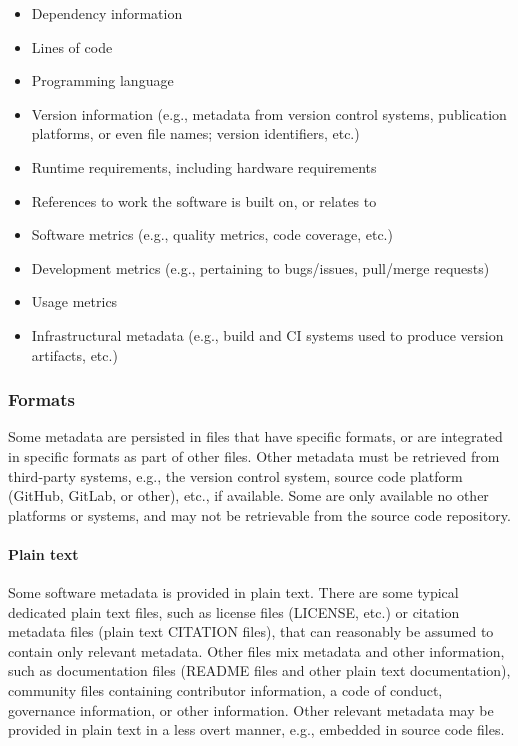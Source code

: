 \documentclass{article}
\begin{document}
\begin{itemize}  
  \item Dependency information
  \item Lines of code
  \item Programming language
  \item Version information (e.g., metadata from version control systems, publication platforms, or even file names; version identifiers, etc.)
  \item Runtime requirements, including hardware requirements
  \item References to work the software is built on, or relates to
  \item Software metrics (e.g., quality metrics, code coverage, etc.)
  \item Development metrics (e.g., pertaining to bugs/issues, pull/merge requests)
  \item Usage metrics
  \item Infrastructural metadata (e.g., build and CI systems used to produce version artifacts, etc.)
\end{itemize}

\subsubsection{Formats}\label{subsubsec:metadata-formats}
Some metadata are persisted in files that have specific formats, or are integrated in specific formats as part of other files. Other metadata must be retrieved from third-party systems, e.g., the version control system, source code platform (GitHub, GitLab, or other), etc., if available. Some are only available no other platforms or systems, and may not be retrievable from the source code repository.



\paragraph{Plain text}\label{par:metadata-formats-plaintext}
Some software metadata is provided in plain text. There are some typical dedicated plain text files, such as license files (LICENSE, etc.) or citation metadata files (plain text CITATION files), that can reasonably be assumed to contain only relevant metadata. Other files mix metadata and other information, such as documentation files (README files and other plain text documentation), community files containing contributor information, a code of conduct, governance information, or other information. Other relevant metadata may be provided in plain text in a less overt manner, e.g., embedded in source code files. 
\end{document}
